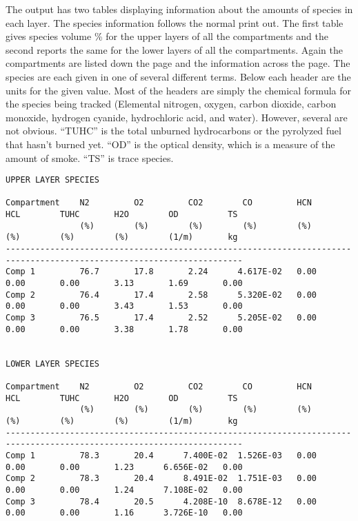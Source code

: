 The output has two tables displaying information about the amounts of species in each layer. The species information follows the normal print out.  The first table gives species volume \% for the upper layers of all the compartments and the second reports the same for the lower layers of all the compartments.  Again the compartments are listed down the page and the information across the page.  The species are each given in one of several different terms.  Below each header are the units for the given value.  Most of the headers are simply the chemical formula for the species being tracked (Elemental nitrogen, oxygen, carbon dioxide, carbon monoxide, hydrogen cyanide, hydrochloric acid, and water).  However, several are not obvious.  ``TUHC'' is the total unburned hydrocarbons or the pyrolyzed fuel that hasn't burned yet.  ``OD'' is the optical density, which is a measure of the amount of smoke. ``TS'' is trace species.

\begin{lstlisting}[basicstyle=\tiny]
UPPER LAYER SPECIES

Compartment    N2         O2         CO2        CO         HCN        HCL        TUHC       H2O        OD          TS
               (%)        (%)        (%)        (%)        (%)        (%)        (%)        (%)        (1/m)       kg
----------------------------------------------------------------------------------------------------------------------
Comp 1         76.7       17.8       2.24      4.617E-02   0.00       0.00       0.00       3.13       1.69       0.00
Comp 2         76.4       17.4       2.58      5.320E-02   0.00       0.00       0.00       3.43       1.53       0.00
Comp 3         76.5       17.4       2.52      5.205E-02   0.00       0.00       0.00       3.38       1.78       0.00


LOWER LAYER SPECIES

Compartment    N2         O2         CO2        CO         HCN        HCL        TUHC       H2O        OD          TS
               (%)        (%)        (%)        (%)        (%)        (%)        (%)        (%)        (1/m)       kg
----------------------------------------------------------------------------------------------------------------------
Comp 1         78.3       20.4      7.400E-02  1.526E-03   0.00       0.00       0.00       1.23      6.656E-02   0.00
Comp 2         78.3       20.4      8.491E-02  1.751E-03   0.00       0.00       0.00       1.24      7.108E-02   0.00
Comp 3         78.4       20.5      4.208E-10  8.678E-12   0.00       0.00       0.00       1.16      3.726E-10   0.00
\end{lstlisting}

